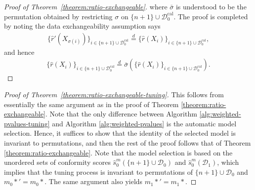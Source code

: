 \documentclass[11pt]{article}
\begin{document}
\begin{proof}[Proof of Theorem~\ref{theorem:ratio-exchangeable}]
where $\bar{\sigma}$ is understood to be the permutation obtained by restricting $\sigma$ on $\{n+1\} \cup \mathcal{D}_{0}^{\mathrm{cal}}$.
The proof is completed by noting the data exchangeability assumption says
\begin{align*}
   \{\hat{r}'(X_{\sigma(i)})\}_{i \in \{n+1\} \cup \mathcal{D}_{0}^{\mathrm{cal}}}
  \overset{d}{=}
  \{\hat{r}(X_{i})\}_{i \in \{n+1\} \cup \mathcal{D}_{0}^{\mathrm{cal}}},
\end{align*}
and hence
\begin{align*}
  \{\hat{r}(X_{i})\}_{i \in \{n+1\} \cup \mathcal{D}_{0}^{\mathrm{cal}}}
  \overset{d}{=}
  \bar{\sigma}(\{\hat{r}(X_i)\}_{i \in \{n+1\} \cup \mathcal{D}_{0}^{\mathrm{cal}}}).
\end{align*}
\end{proof}

\begin{proof}[Proof of Theorem~\ref{theorem:ratio-exchangeable-tuning}]
This follows from essentially the same argument as in the proof of Theorem \ref{theorem:ratio-exchangeable}. Note that the only difference between Algorithm \ref{alg:weighted-pvalues-tuning} and Algorithm \ref{alg:weighted-pvalues} is the automatic model selection. Hence, it suffices to show that the identity of the selected model is invariant to permutations, and then the rest of the proof follows that of Theorem \ref{theorem:ratio-exchangeable}. 
Note that the model selection is based on the unordered sets of conformity scores $\hat{s}_0^m(\{n+1\} \cup \mathcal{D}_{0})$ and $\hat{s}_0^m(\mathcal{D}_{1})$, which implies that the tuning process is invariant to permutations of $\{n+1\} \cup \mathcal{D}_{0}$ and $m_0*'=m_0*$. The same argument also yields $m_1*'=m_1*$.
\end{proof}
\end{document}
